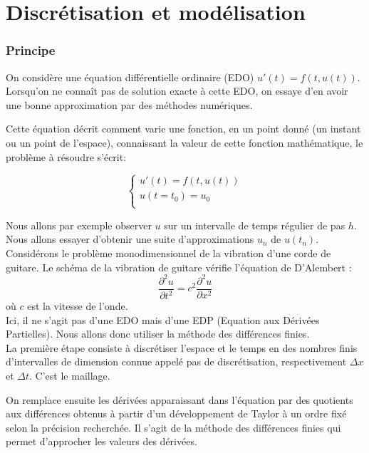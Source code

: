 \part{Discrétisation et modélisation}

\section{Principe}

On  considère  une  équation  différentielle  ordinaire  (EDO) $u'(t)=f(t,u(t))$. Lorsqu'on ne  connaît pas de solution exacte à cette EDO, on essaye d'en avoir une bonne approximation par  des méthodes numériques.

Cette équation décrit comment varie une fonction, en un point donné (un instant ou un point de l'espace), connaissant la valeur de cette fonction mathématique, le problème à résoudre s'écrit:

\begin{equation*}
\left \{
\begin{array}{rcl}
u'(t)=f(t,u(t))\\
u(t=t_0) = u_0 \\
\end{array}
\right.
\end{equation*}

Nous  allons par  exemple  observer  $u$  sur un intervalle de  temps
régulier de pas $h$. Nous  allons  essayer  d'obtenir  une suite  d'approximations  $u_n$  de
$u(t_n)$.\\

Considérons le problème monodimensionnel de la vibration d'une corde de guitare. Le schéma de la vibration de guitare vérifie l'équation de D'Alembert :
\begin{equation*}
\frac{\partial^2u}{\partial t^2} = c^{2}\frac{\partial^2u}{\partial x^2}
\end{equation*}
où $c$ est la vitesse de l'onde.\\

Ici, il ne s'agit pas d'une EDO mais d'une EDP (Equation aux Dérivées Partielles). Nous allons donc utiliser la méthode des différences finies.\\

La première étape consiste à discrétiser l'espace et le temps en des nombres finis d'intervalles de dimension connue appelé pas de discrétisation, respectivement $\Delta x$ et $\Delta t$. C'est le maillage.

On remplace ensuite les dérivées apparaissant dans l'équation par des quotients aux différences obtenus à partir d'un développement de Taylor à un ordre fixé selon la précision recherchée. Il s'agit de la méthode des différences finies qui permet d'approcher les valeurs des dérivées.\\

